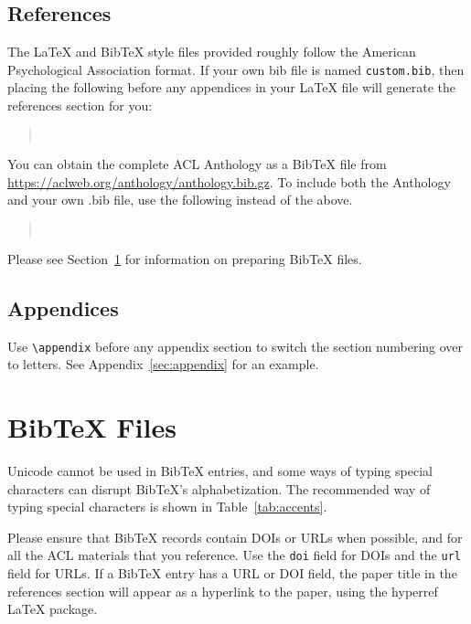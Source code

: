 \documentclass[11pt]{article}
\begin{document}
\subsection{References}

\nocite{Ando2005,borschinger-johnson-2011-particle,andrew2007scalable,rasooli-tetrault-2015,goodman-etal-2016-noise,harper-2014-learning}

The \LaTeX{} and Bib\TeX{} style files provided roughly follow the American Psychological Association format.
If your own bib file is named \texttt{custom.bib}, then placing the following before any appendices in your \LaTeX{} file will generate the references section for you:
\begin{quote}
\begin{verbatim}


\end{verbatim}
\end{quote}

You can obtain the complete ACL Anthology as a Bib\TeX{} file from \url{https://aclweb.org/anthology/anthology.bib.gz}.
To include both the Anthology and your own .bib file, use the following instead of the above.
\begin{quote}
\begin{verbatim}


\end{verbatim}
\end{quote}

Please see Section~\ref{sec:bibtex} for information on preparing Bib\TeX{} files.

\subsection{Appendices}

Use \verb|\appendix| before any appendix section to switch the section numbering over to letters. See Appendix~\ref{sec:appendix} for an example.

\section{Bib\TeX{} Files}
\label{sec:bibtex}

Unicode cannot be used in Bib\TeX{} entries, and some ways of typing special characters can disrupt Bib\TeX's alphabetization. The recommended way of typing special characters is shown in Table~\ref{tab:accents}.

Please ensure that Bib\TeX{} records contain DOIs or URLs when possible, and for all the ACL materials that you reference.
Use the \verb|doi| field for DOIs and the \verb|url| field for URLs.
If a Bib\TeX{} entry has a URL or DOI field, the paper title in the references section will appear as a hyperlink to the paper, using the hyperref \LaTeX{} package.
\end{document}
